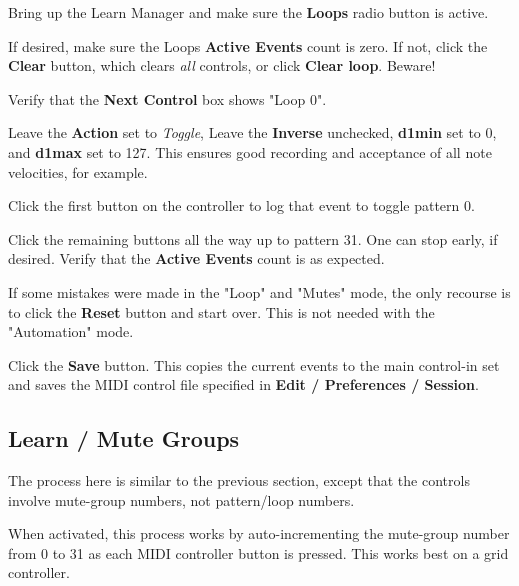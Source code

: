    \begin{enumber}
      \item Bring up the Learn Manager and make sure the \textbf{Loops}
         radio button is active.
      \item If desired, make sure the Loops
         \textbf{Active Events} count is zero.
         If not, click the \textbf{Clear} button, which clears
         \textsl{all} controls, or click \textbf{Clear loop}.
         Beware!
      \item Verify that the \textbf{Next Control} box shows "Loop 0".
      \item Leave the \textbf{Action} set to \textsl{Toggle},
         Leave the \textbf{Inverse} unchecked, \textbf{d1min} set to 0,
         and \textbf{d1max} set to 127.
         This ensures good recording and acceptance of all note velocities,
         for example.
      \item Click the first button on the controller to log that event
         to toggle pattern 0.
      \item Click the remaining buttons all the way up to pattern 31.
         One can stop early, if desired.
         Verify that the \textbf{Active Events} count is
         as expected.
      \item If some mistakes were made in the "Loop" and "Mutes"
         mode, the only recourse is to
         click the \textbf{Reset} button and start over.
         This is not needed with the "Automation" mode.
      \item Click the \textbf{Save} button.
         This copies the current events to the main control-in set
         and saves the MIDI control file specified in
         \textbf{Edit / Preferences / Session}.
   \end{enumber}

\subsection{Learn / Mute Groups}
\label{subsec:midi_mute_groups}

   The process here is similar to the previous section, except that the
   controls involve mute-group numbers, not pattern/loop numbers.

   When activated, this process works by auto-incrementing the
   mute-group number
   from 0 to 31 as each MIDI controller button is pressed.
   This works best on a grid controller.

